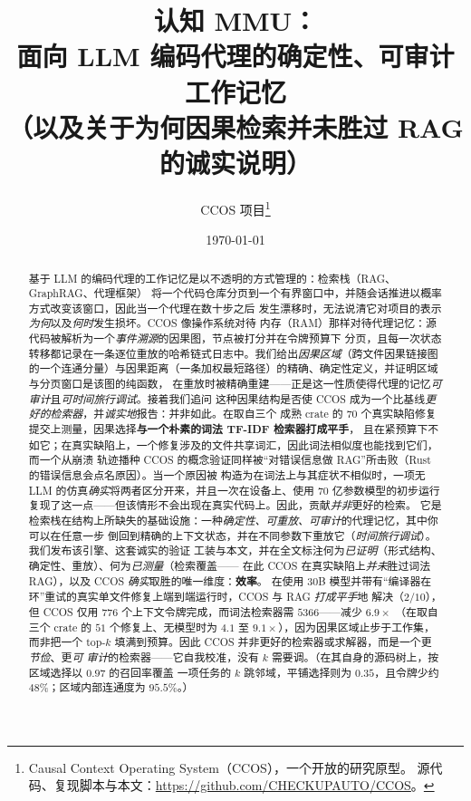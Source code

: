 \documentclass[11pt]{ctexart}
\title{\textbf{认知 MMU：\\ 面向 LLM 编码代理的确定性、可审计工作记忆\\ \large （以及关于为何因果检索并未胜过 RAG 的诚实说明）}}
\author{CCOS 项目\thanks{Causal Context Operating System（CCOS），一个开放的研究原型。
源代码、复现脚本与本文：\url{https://github.com/CHECKUPAUTO/CCOS}。}}
\date{\today}
\begin{document}
\maketitle

\begin{abstract}
基于 LLM 的编码代理的工作记忆是以不透明的方式管理的：检索栈（RAG、GraphRAG、代理框架）
将一个代码仓库分页到一个有界窗口中，并随会话推进以概率方式改变该窗口，因此当一个代理在数十步之后
发生漂移时，无法说清它对项目的表示\emph{为何}以及\emph{何时}发生损坏。CCOS 像操作系统对待
内存（RAM）那样对待代理记忆：源代码被解析为一个\emph{事件溯源}的因果图，节点被打分并在令牌预算下
分页，且每一次状态转移都记录在一条逐位重放的哈希链式日志中。我们给出\emph{因果区域}（跨文件因果链接图
的一个连通分量）与因果距离（一条加权最短路径）的精确、确定性定义，并证明区域与分页窗口是该图的纯函数，
在重放时被精确重建——正是这一性质使得代理的记忆\emph{可审计}且\emph{可时间旅行调试}。接着我们追问
这种因果结构是否使 CCOS 成为一个比基线\emph{更好的检索器}，并\emph{诚实地}报告：并非如此。在取自三个
成熟 crate 的 $70$ 个真实缺陷修复提交上测量，因果选择\textbf{与一个朴素的词法 TF-IDF 检索器打成平手}，
且在紧预算下不如它；在真实缺陷上，一个修复涉及的文件共享词汇，因此词法相似度也能找到它们，而一个从崩溃
轨迹播种 CCOS 的概念验证同样被“对错误信息做 RAG”所击败（Rust 的错误信息会点名原因）。当一个原因被
构造为在词法上与其症状不相似时，一项无 LLM 的仿真\emph{确实}将两者区分开来，并且一次在设备上、使用
$70$ 亿参数模型的初步运行复现了这一点——但该情形不会出现在真实代码上。因此，贡献\emph{并非}更好的检索。
它是检索栈在结构上所缺失的基础设施：一种\emph{确定性、可重放、可审计}的代理记忆，其中你可以在任意一步
倒回到精确的上下文状态，并在不同参数下重放它（\emph{时间旅行调试}）。我们发布该引擎、这套诚实的验证
工装与本文，并在全文标注何为\emph{已证明}（形式结构、确定性、重放）、何为\emph{已测量}（检索覆盖——
在此 CCOS 在真实缺陷上\emph{并未}胜过词法 RAG），以及 CCOS \emph{确实}取胜的唯一维度：\textbf{效率}。
在使用 30B 模型并带有“编译器在环”重试的真实单文件修复上端到端运行时，CCOS 与 RAG \emph{打成平手}地
解决（$2/10$），但 CCOS 仅用 $776$ 个上下文令牌完成，而词法检索器需 $5366$——减少 $6.9\times$
（在取自三个 crate 的 $51$ 个修复上、无模型时为 $4.1$ 至 $9.1\times$），因为因果区域止步于工作集，
而非把一个 top-$k$ 填满到预算。因此 CCOS 并非更好的检索器或求解器，而是一个更\emph{节俭}、更\emph{可
审计}的检索器——它自我校准，没有 $k$ 需要调。（在其自身的源码树上，按区域选择以 $0.97$ 的召回率覆盖
一项任务的 $k$ 跳邻域，平铺选择则为 $0.35$，且令牌少约 $48\%$；区域内部连通度为 $95.5\%$。）
\end{abstract}
\end{document}
